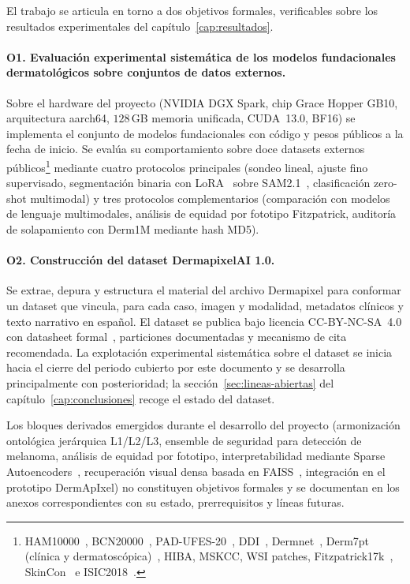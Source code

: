 El trabajo se articula en torno a dos objetivos formales,
verificables sobre los resultados experimentales del
capítulo~\ref{cap:resultados}.

\paragraph{O1. Evaluación experimental sistemática de los modelos
fundacionales dermatológicos sobre conjuntos de datos externos.}
Sobre el hardware del proyecto (NVIDIA DGX Spark, chip Grace Hopper
GB10, arquitectura aarch64, $128$\,GB memoria unificada,
CUDA~13.0, BF16) se implementa el conjunto de modelos fundacionales
con código y pesos públicos a la fecha de inicio. Se evalúa su
comportamiento sobre doce datasets externos
públicos\footnote{HAM10000~\cite{ham10000},
BCN20000~\cite{bcn20000}, PAD-UFES-20~\cite{padufes},
DDI~\cite{ddi}, Dermnet~\cite{dermnet}, Derm7pt
(clínica y dermatoscópica)~\cite{kawahara2019}, HIBA, MSKCC, WSI
patches, Fitzpatrick17k~\cite{fitzpatrick17k},
SkinCon~\cite{skincon} e ISIC2018~\cite{isic2018}.} mediante cuatro
protocolos principales (sondeo lineal, ajuste fino supervisado,
segmentación binaria con LoRA~\cite{lora} sobre SAM2.1~\cite{sam2},
clasificación zero-shot multimodal) y tres protocolos
complementarios (comparación con modelos de lenguaje multimodales,
análisis de equidad por fototipo Fitzpatrick, auditoría de
solapamiento con Derm1M mediante hash MD5).

\paragraph{O2. Construcción del dataset DermapixelAI 1.0.}
Se extrae, depura y estructura el material del archivo Dermapixel
para conformar un dataset que vincula, para cada caso, imagen y
modalidad, metadatos clínicos y texto narrativo en español. El
dataset se publica bajo licencia CC-BY-NC-SA~4.0 con datasheet
formal~\cite{datasheets2018}, particiones documentadas y mecanismo
de cita recomendada. La explotación experimental sistemática sobre
el dataset se inicia hacia el cierre del periodo cubierto por este
documento y se desarrolla principalmente con posterioridad;
la secci\'on~\ref{sec:lineas-abiertas} del capítulo~\ref{cap:conclusiones}
recoge el estado del dataset.

Los bloques derivados emergidos durante el desarrollo del proyecto
(armonización ontológica jerárquica L1/L2/L3, ensemble de seguridad
para detección de melanoma, análisis de equidad por fototipo,
interpretabilidad mediante Sparse Autoencoders~\cite{templeton2024},
recuperación visual densa basada en FAISS~\cite{faiss2019},
integración en el prototipo DermApIxel) no constituyen objetivos
formales y se documentan en los anexos correspondientes con su
estado, prerrequisitos y líneas futuras.


